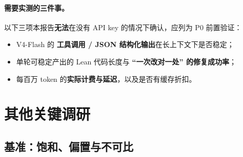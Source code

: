 \documentclass[UTF8,a4paper,11pt,fontset=windows]{ctexart}
\begin{document}
\paragraph{需要实测的三件事。}以下三项本报告\textbf{无法}在没有 API key 的情况下确认，应列为 P0 前置验证：
\begin{itemize}
  \item V4-Flash 的 \textbf{工具调用 / JSON 结构化输出}在长上下文下是否稳定；
  \item 单轮可稳定产出的 Lean 代码长度与 \textbf{``一次改对一处'' 的修复成功率}；
  \item 每百万 token 的\textbf{实际计费与延迟}，以及是否有缓存折扣。
\end{itemize}

\section{其他关键调研}

\subsection{基准：饱和、偏置与不可比}\label{sec:bench}
\end{document}
